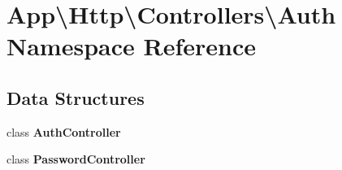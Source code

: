 \section{App\textbackslash{}Http\textbackslash{}Controllers\textbackslash{}Auth Namespace Reference}
\label{namespace_app_1_1_http_1_1_controllers_1_1_auth}
\subsection*{Data Structures}
\begin{DoxyCompactItemize}
\item 
class {\bf Auth\+Controller}
\item 
class {\bf Password\+Controller}
\end{DoxyCompactItemize}

